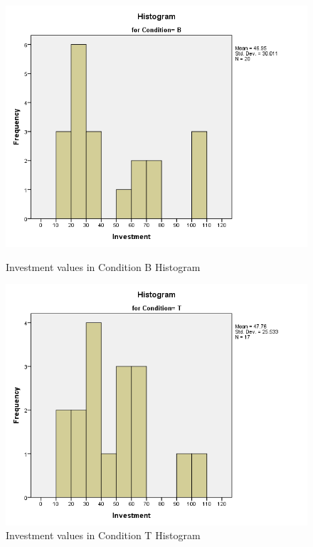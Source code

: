 \begin{figure}[h]
    \centering
    \begin{minipage}[b]{110px}
        \centering
        \includegraphics[width=\textwidth]{graphs/InvestmentHisto1.png}
        \caption{Investment values in Condition B Histogram}
        \label{fig:InvestmentConditionBHistogram}
    \end{minipage}
    \hfill
    \begin{minipage}[b]{110px}
        \centering
        \includegraphics[width=\textwidth]{graphs/InvestmentHisto2.png}
        \caption{Investment values in Condition T Histogram}
        \label{fig:InvestmentConditionTHistogram}
    \end{minipage}
\end{figure}


